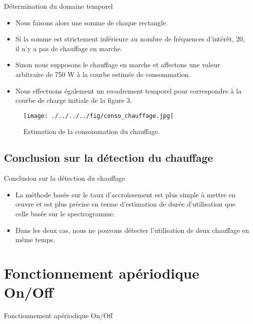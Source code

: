 \documentclass{beamer}
\begin{document}
\begin{frame}{Détermination du domaine temporel}
\begin{itemize}
	\item Nous faisons alors une somme de chaque rectangle.
	\item Si la somme est strictement inférieure au nombre de fréquences d'intérêt, 20, il n'y a pas de chauffage en marche.
	\item Sinon nous supposons le chauffage en marche et affectons une valeur arbitraire de 750 W à la courbe estimée de consommation.
	\item Nous effectuons également un recadrement temporel pour correspondre à la courbe de charge initiale de la figure 3.
\end{itemize}
\end{frame}

\begin{frame}
\begin{figure}[!h]
\begin{center}
\texttt{[image: ./../../../fig/conso\_chauffage.jpg]}
\caption{Estimation de la consommation du chauffage.}
\label{Figure12}
\end{center}
\end{figure}
\end{frame}

\subsection{Conclusion sur la détection du chauffage}
\begin{frame}{Conclusion sur la détection du chauffage}
\begin{itemize}
	\item La méthode basée sur le taux d'accroissement est plus simple à mettre en œuvre et est plus précise en terme d'estimation de durée d'utilisation que celle basée sur le spectrogramme.
	\item Dans les deux cas, nous ne pouvons détecter l'utilisation de deux chauffage en même temps.
\end{itemize}
\end{frame}

\section{Fonctionnement apériodique On/Off}

\begin{frame}{Fonctionnement apériodique On/Off}
\end{frame}
\end{document}

